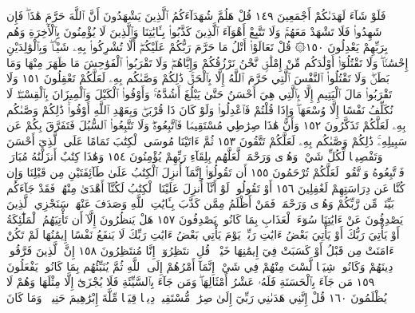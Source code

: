 فَلَوْ شَآءَ لَهَدَىٰكُمْ أَجْمَعِينَ ١٤٩ قُلْ هَلُمَّ شُهَدَآءَكُمُ
ٱلَّذِينَ يَشْهَدُونَ أَنَّ ٱللَّهَ حَرَّمَ هَٰذَاۖ فَإِن شَهِدُوا۟ فَلَا تَشْهَدْ
مَعَهُمْۚ وَلَا تَتَّبِعْ أَهْوَآءَ ٱلَّذِينَ كَذَّبُوا۟ بِـَٔايَٰتِنَا وَٱلَّذِينَ
لَا يُؤْمِنُونَ بِٱلْأٓخِرَةِ وَهُم بِرَبِّهِمْ يَعْدِلُونَ ١٥٠۞ قُلْ
تَعَالَوْا۟ أَتْلُ مَا حَرَّمَ رَبُّكُمْ عَلَيْكُمْۖ أَلَّا تُشْرِكُوا۟
بِهِۦ شَيْـࣰٔاۖ وَبِٱلْوَٰلِدَيْنِ إِحْسَٰنࣰاۖ وَلَا تَقْتُلُوٓا۟ أَوْلَٰدَكُم
مِّنْ إِمْلَٰقࣲ نَّحْنُ نَرْزُقُكُمْ وَإِيَّاهُمْۖ وَلَا تَقْرَبُوا۟ ٱلْفَوَٰحِشَ
مَا ظَهَرَ مِنْهَا وَمَا بَطَنَۖ وَلَا تَقْتُلُوا۟ ٱلنَّفْسَ ٱلَّتِي حَرَّمَ ٱللَّهُ
إِلَّا بِٱلْحَقِّۚ ذَٰلِكُمْ وَصَّىٰكُم بِهِۦ لَعَلَّكُمْ تَعْقِلُونَ ١٥١
وَلَا تَقْرَبُوا۟ مَالَ ٱلْيَتِيمِ إِلَّا بِٱلَّتِي هِيَ أَحْسَنُ حَتَّىٰ يَبْلُغَ أَشُدَّهُۥۚ
وَأَوْفُوا۟ ٱلْكَيْلَ وَٱلْمِيزَانَ بِٱلْقِسْطِۖ لَا نُكَلِّفُ نَفْسًا إِلَّا
وُسْعَهَاۖ وَإِذَا قُلْتُمْ فَٱعْدِلُوا۟ وَلَوْ كَانَ ذَا قُرْبَىٰۖ وَبِعَهْدِ
ٱللَّهِ أَوْفُوا۟ۚ ذَٰلِكُمْ وَصَّىٰكُم بِهِۦ لَعَلَّكُمْ تَذَكَّرُونَ ١٥٢
وَأَنَّ هَٰذَا صِرَٰطِي مُسْتَقِيمࣰا فَٱتَّبِعُوهُۖ وَلَا تَتَّبِعُوا۟ ٱلسُّبُلَ
فَتَفَرَّقَ بِكُمْ عَن سَبِيلِهِۦۚ ذَٰلِكُمْ وَصَّىٰكُم بِهِۦ لَعَلَّكُمْ
تَتَّقُونَ ١٥٣ ثُمَّ ءَاتَيْنَا مُوسَى ٱلْكِتَٰبَ تَمَامًا عَلَى ٱلَّذِيٓ
أَحْسَنَ وَتَفْصِيلࣰا لِّكُلِّ شَيْءࣲ وَهُدࣰى وَرَحْمَةࣰ لَّعَلَّهُم بِلِقَآءِ
رَبِّهِمْ يُؤْمِنُونَ ١٥٤ وَهَٰذَا كِتَٰبٌ أَنزَلْنَٰهُ مُبَارَكࣱ فَٱتَّبِعُوهُ
وَٱتَّقُوا۟ لَعَلَّكُمْ تُرْحَمُونَ ١٥٥ أَن تَقُولُوٓا۟ إِنَّمَآ أُنزِلَ ٱلْكِتَٰبُ عَلَىٰ
طَآئِفَتَيْنِ مِن قَبْلِنَا وَإِن كُنَّا عَن دِرَاسَتِهِمْ لَغَٰفِلِينَ ١٥٦
أَوْ تَقُولُوا۟ لَوْ أَنَّآ أُنزِلَ عَلَيْنَا ٱلْكِتَٰبُ لَكُنَّآ أَهْدَىٰ
مِنْهُمْۚ فَقَدْ جَآءَكُم بَيِّنَةࣱ مِّن رَّبِّكُمْ وَهُدࣰى وَرَحْمَةࣱۚ
فَمَنْ أَظْلَمُ مِمَّن كَذَّبَ بِـَٔايَٰتِ ٱللَّهِ وَصَدَفَ عَنْهَاۗ سَنَجْزِي ٱلَّذِينَ
يَصْدِفُونَ عَنْ ءَايَٰتِنَا سُوٓءَ ٱلْعَذَابِ بِمَا كَانُوا۟ يَصْدِفُونَ ١٥٧
هَلْ يَنظُرُونَ إِلَّآ أَن تَأْتِيَهُمُ ٱلْمَلَٰٓئِكَةُ أَوْ يَأْتِيَ رَبُّكَ أَوْ يَأْتِيَ بَعْضُ
ءَايَٰتِ رَبِّكَۗ يَوْمَ يَأْتِي بَعْضُ ءَايَٰتِ رَبِّكَ لَا يَنفَعُ نَفْسًا إِيمَٰنُهَا
لَمْ تَكُنْ ءَامَنَتْ مِن قَبْلُ أَوْ كَسَبَتْ فِيٓ إِيمَٰنِهَا خَيْرࣰاۗ قُلِ ٱنتَظِرُوٓا۟
إِنَّا مُنتَظِرُونَ ١٥٨ إِنَّ ٱلَّذِينَ فَرَّقُوا۟ دِينَهُمْ وَكَانُوا۟ شِيَعࣰا لَّسْتَ مِنْهُمْ
فِي شَيْءٍۚ إِنَّمَآ أَمْرُهُمْ إِلَى ٱللَّهِ ثُمَّ يُنَبِّئُهُم بِمَا كَانُوا۟ يَفْعَلُونَ ١٥٩
مَن جَآءَ بِٱلْحَسَنَةِ فَلَهُۥ عَشْرُ أَمْثَالِهَاۖ وَمَن جَآءَ بِٱلسَّيِّئَةِ
فَلَا يُجْزَىٰٓ إِلَّا مِثْلَهَا وَهُمْ لَا يُظْلَمُونَ ١٦٠ قُلْ إِنَّنِي هَدَىٰنِي رَبِّيٓ
إِلَىٰ صِرَٰطࣲ مُّسْتَقِيمࣲ دِينࣰا قِيَمࣰا مِّلَّةَ إِبْرَٰهِيمَ حَنِيفࣰاۚ وَمَا كَانَ
